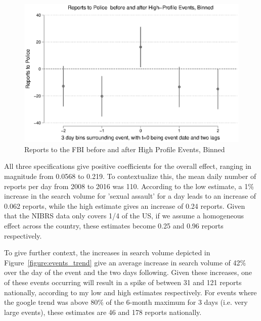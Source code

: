 \documentclass[AER,draftmode]{AEA}
\begin{document}
\begin{figure}
\includegraphics[width=\linewidth]{figures/events_police_binned.eps}
\caption{Reports to the FBI before and after High Profile Events, Binned} \label{figure:events_police_binned}
\end{figure}

All three specifications give positive coefficients for the overall effect, ranging in magnitude from 0.0568 to 0.219. To contextualize this, the mean daily number of reports per day from 2008 to 2016 was 110.  According to the low estimate, a 1\% increase in the search volume for 'sexual assault' for a day leads to an increase of 0.062 reports, while the high estimate gives an increase of 0.24 reports. Given that the NIBRS data only covers 1/4 of the US, if we assume a homogeneous effect across the country, these estimates become 0.25 and 0.96 reports respectively.

To give further context, the increases in search volume depicted in Figure~\ref{figure:events_trend} give an average increase in search volume of 42\% over the day of the event and the two days following. Given these increases, one of these events occurring will result in a spike of between 31 and 121 reports nationally, according to my low and high estimates respectively. For events where the google trend was above 80\% of the 6-month maximum for 3 days (i.e. very large events), these estimates are 46 and 178 reports nationally.
\end{document}
